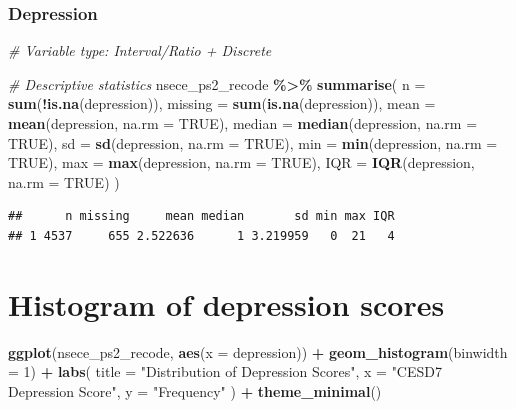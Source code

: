 \documentclass[
]{article}
\newenvironment{Shaded}{\begin{snugshade}}{\end{snugshade}}
\newcommand{\AttributeTok}[1]{\textcolor[rgb]{0.13,0.29,0.53}{#1}}
\newcommand{\CommentTok}[1]{\textcolor[rgb]{0.56,0.35,0.01}{\textit{#1}}}
\newcommand{\ConstantTok}[1]{\textcolor[rgb]{0.56,0.35,0.01}{#1}}
\newcommand{\DecValTok}[1]{\textcolor[rgb]{0.00,0.00,0.81}{#1}}
\newcommand{\FunctionTok}[1]{\textcolor[rgb]{0.13,0.29,0.53}{\textbf{#1}}}
\newcommand{\NormalTok}[1]{#1}
\newcommand{\SpecialCharTok}[1]{\textcolor[rgb]{0.81,0.36,0.00}{\textbf{#1}}}
\newcommand{\StringTok}[1]{\textcolor[rgb]{0.31,0.60,0.02}{#1}}
\begin{document}
\newpage

\subsubsection{Depression}\label{depression}

\begin{Shaded}
\begin{Highlighting}[]
\CommentTok{\# Variable type: Interval/Ratio + Discrete}

\CommentTok{\# Descriptive statistics}
\NormalTok{nsece\_ps2\_recode }\SpecialCharTok{\%\textgreater{}\%}
  \FunctionTok{summarise}\NormalTok{(}
    \AttributeTok{n =} \FunctionTok{sum}\NormalTok{(}\SpecialCharTok{!}\FunctionTok{is.na}\NormalTok{(depression)),}
    \AttributeTok{missing =} \FunctionTok{sum}\NormalTok{(}\FunctionTok{is.na}\NormalTok{(depression)),}
    \AttributeTok{mean =} \FunctionTok{mean}\NormalTok{(depression, }\AttributeTok{na.rm =} \ConstantTok{TRUE}\NormalTok{),}
    \AttributeTok{median =} \FunctionTok{median}\NormalTok{(depression, }\AttributeTok{na.rm =} \ConstantTok{TRUE}\NormalTok{),}
    \AttributeTok{sd =} \FunctionTok{sd}\NormalTok{(depression, }\AttributeTok{na.rm =} \ConstantTok{TRUE}\NormalTok{),}
    \AttributeTok{min =} \FunctionTok{min}\NormalTok{(depression, }\AttributeTok{na.rm =} \ConstantTok{TRUE}\NormalTok{),}
    \AttributeTok{max =} \FunctionTok{max}\NormalTok{(depression, }\AttributeTok{na.rm =} \ConstantTok{TRUE}\NormalTok{),}
    \AttributeTok{IQR =} \FunctionTok{IQR}\NormalTok{(depression, }\AttributeTok{na.rm =} \ConstantTok{TRUE}\NormalTok{)}
\NormalTok{  )}
\end{Highlighting}
\end{Shaded}

\begin{verbatim}
##      n missing     mean median       sd min max IQR
## 1 4537     655 2.522636      1 3.219959   0  21   4
\end{verbatim}

\section{Histogram of depression
scores}\label{histogram-of-depression-scores}

\begin{Shaded}
\begin{Highlighting}[]
\FunctionTok{ggplot}\NormalTok{(nsece\_ps2\_recode,}
       \FunctionTok{aes}\NormalTok{(}\AttributeTok{x =}\NormalTok{ depression)) }\SpecialCharTok{+}
  \FunctionTok{geom\_histogram}\NormalTok{(}\AttributeTok{binwidth =} \DecValTok{1}\NormalTok{) }\SpecialCharTok{+}
  \FunctionTok{labs}\NormalTok{(}
    \AttributeTok{title =} \StringTok{"Distribution of Depression Scores"}\NormalTok{,}
    \AttributeTok{x =} \StringTok{"CESD7 Depression Score"}\NormalTok{,}
    \AttributeTok{y =} \StringTok{"Frequency"}
\NormalTok{  ) }\SpecialCharTok{+}
  \FunctionTok{theme\_minimal}\NormalTok{()}
\end{Highlighting}
\end{Shaded}
\end{document}
